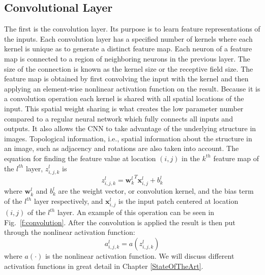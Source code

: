 \subsection{Convolutional Layer}
The first is the convolution layer. 
Its purpose is to learn feature representations of the inputs. 
Each convolution layer has a specified number of kernels where each kernel is unique as to generate a distinct feature map. 
Each neuron of a feature map is connected to a region of neighboring neurons in the previous layer. 
The size of the connection is known as the kernel size or the receptive field size. 
The feature map is obtained by first convolving the input with the kernel and then applying an element-wise nonlinear activation function on the result. 
Because it is a convolution operation each kernel is shared with all spatial locations of the input. 
This spatial weight sharing is what creates the low parameter number compared to a regular neural network which fully connects all inputs and outputs. 
It also allows the CNN to take advantage of the underlying structure in images. 
Topological information, i.e., spatial information about the structure in an image, such as adjacency and rotations are also taken into account. 
The equation for finding the feature value at location $(i,j)$ in the $k^{th}$ feature map of the $l^{th}$ layer, $z^l_{i,j,k}$ is
\begin{equation}
z^l_{i,j,k} = {\textbf{w}^l_k}^T \textbf{x}^l_{i,j} + b^l_k
\label{eq:convbasic}
\end{equation}
where $\textbf{w}^l_k$ and $b^l_k$ are the weight vector, or convolution kernel, and the bias term of the $l^{th}$ layer respectively, and $\textbf{x}^l_{i,j}$ is the input patch centered at location $(i,j)$ of the $l^{th}$ layer. 
An example of this operation can be seen in Fig.~\ref{f:convolution}. 
After the convolution is applied the result is then put through the nonlinear activation function:
\begin{equation}
a^l_{i,j,k} = a(z^l_{i,j,k})
\label{eq:activationbasic}
\end{equation}
where $a(\cdot)$ is the nonlinear activation function. 
We will discuss different activation functions in great detail in Chapter \ref{StateOfTheArt}.

